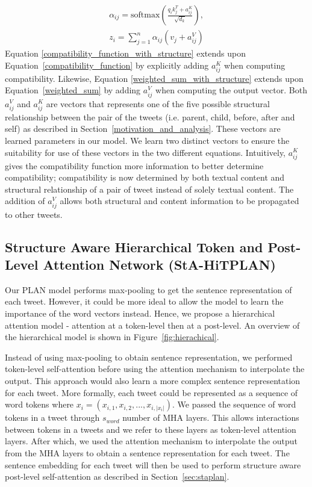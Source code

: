 \documentclass[letterpaper]{article} %
\begin{document}
\begin{eqnarray}
\alpha_{ij} = \mathrm{softmax}(\frac{q_{i}k_{j}^T + a_{ij}^K}{\sqrt{d_{k}}}) \label{compatibility_function_with_structure}, \\
z_i = \sum_{j=1}^{n} \alpha_{ij} (v_j + a_{ij}^V) \label{weighted_sum_with_structure}
\end{eqnarray} 
Equation \ref{compatibility_function_with_structure} extends upon Equation~\ref{compatibility_function} by explicitly adding $a_{ij}^K$ when computing compatibility. Likewise, Equation \ref{weighted_sum_with_structure} extends upon Equation~\ref{weighted_sum} by adding $a_{ij}^V$ when computing the output vector.
Both $a_{ij}^V$ and $a_{ij}^K$ are vectors that represents one of the five possible structural relationship between the pair of the tweets (i.e. parent, child, before, after and self) as described in Section~\ref{motivation_and_analysis}. These vectors are learned parameters in our model. We learn two distinct vectors to ensure the suitability for use of these vectors in the two different equations.
Intuitively, $a_{ij}^K$ gives the compatibility function more information to better determine compatibility; compatibility is now determined by both textual content and structural relationship of a pair of tweet instead of solely textual content. The addition of $a_{ij}^V$ allows both structural and content information to be propagated to other tweets. 

\subsection{Structure Aware Hierarchical Token and Post-Level Attention Network (StA-HiTPLAN)}
\label{sec:stahitplan}
Our PLAN model performs max-pooling to get the sentence representation of each tweet. However, it could be more ideal to allow the model to learn the importance of the word vectors instead. Hence, we propose a hierarchical attention model - attention at a token-level then at a post-level. An overview of the hierarchical model is shown in Figure~\ref{fig:hierachical}.

Instead of using max-pooling to obtain sentence representation, we performed token-level self-attention before using the attention mechanism to interpolate the output. This approach would also learn a more complex sentence representation for each tweet. More formally, each tweet could be represented as a sequence of word tokens where  $x_{i} = (x_{i,1}, x_{i,2}, ..., x_{i,|x_i|})$. We passed the sequence of word tokens in a tweet through $s_{word}$ number of MHA layers. This allows interactions between tokens in a tweets and we refer to these layers as token-level attention layers. After which, we used the attention mechanism to interpolate the output from the MHA layers to obtain a sentence representation for each tweet. The sentence embedding for each tweet will then be used to perform structure aware post-level self-attention as described in Section~\ref{sec:staplan}.
\end{document}
